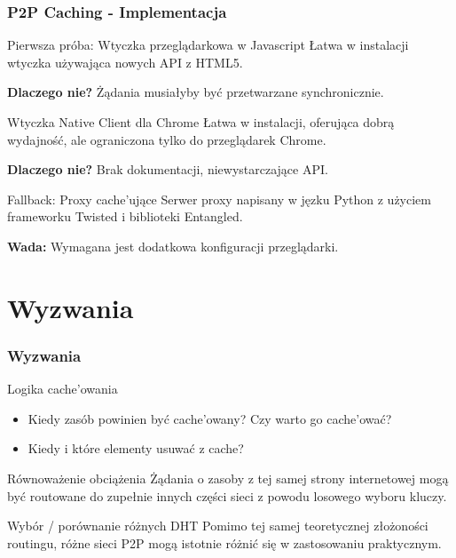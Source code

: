 \documentclass{beamer}
\begin{document}
\begin{frame}
\frametitle{P2P Caching - Implementacja}

\begin{block}{Pierwsza próba: Wtyczka przeglądarkowa w Javascript}
Łatwa w instalacji wtyczka używająca nowych API z HTML5.

\textbf{Dlaczego nie?} Żądania musiałyby być przetwarzane synchronicznie.
\end{block}

\pause
\begin{block}{Wtyczka Native Client dla Chrome}
Łatwa w instalacji, oferująca dobrą wydajność, ale ograniczona tylko do przeglądarek Chrome.

\textbf{Dlaczego nie?} Brak dokumentacji, niewystarczające API.
\end{block}

\pause
\begin{block}{Fallback: Proxy cache'ujące}
Serwer proxy napisany w jęzku Python z użyciem frameworku Twisted i biblioteki Entangled.

\textbf{Wada:} Wymagana jest dodatkowa konfiguracji przeglądarki.
\end{block}

\end{frame}

\section{Wyzwania}
\begin{frame}
\frametitle{Wyzwania}

\begin{block}{Logika cache'owania}
\begin{itemize}
  \item Kiedy zasób powinien być cache'owany? Czy warto go cache'ować?
  \item Kiedy i które elementy usuwać z cache?
\end{itemize}
\end{block}

\begin{block}{Równoważenie obciążenia}
Żądania o zasoby z tej samej strony internetowej mogą być routowane do zupełnie
innych części sieci z powodu losowego wyboru kluczy.
\end{block}

\begin{block}{Wybór / porównanie różnych DHT}
Pomimo tej samej teoretycznej złożoności routingu, różne sieci P2P
mogą istotnie różnić się w zastosowaniu praktycznym.
\end{block}

\end{frame}
\end{document}
